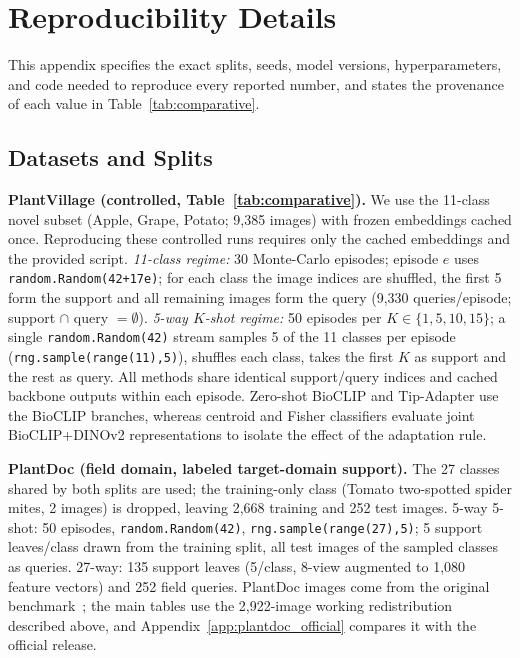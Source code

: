\appendix
\section{Reproducibility Details}
\label{app:repro}
This appendix specifies the exact splits, seeds, model versions, hyperparameters, and code needed to reproduce every reported number, and states the provenance of each value in Table~\ref{tab:comparative}.

\subsection{Datasets and Splits}
\textbf{PlantVillage (controlled, Table~\ref{tab:comparative}).} We use the 11-class novel subset (Apple, Grape, Potato; 9{,}385 images) with frozen embeddings cached once. Reproducing these controlled runs requires only the cached embeddings and the provided script. \emph{11-class regime:} 30 Monte-Carlo episodes; episode $e$ uses \texttt{random.Random(42+17e)}; for each class the image indices are shuffled, the first 5 form the support and all remaining images form the query (9{,}330 queries/episode; support $\cap$ query $=\emptyset$). \emph{5-way $K$-shot regime:} 50 episodes per $K\in\{1,5,10,15\}$; a single \texttt{random.Random(42)} stream samples 5 of the 11 classes per episode (\texttt{rng.sample(range(11),5)}), shuffles each class, takes the first $K$ as support and the rest as query. All methods share identical support/query indices and cached backbone outputs within each episode. Zero-shot BioCLIP and Tip-Adapter use the BioCLIP branches, whereas centroid and Fisher classifiers evaluate joint BioCLIP+DINOv2 representations to isolate the effect of the adaptation rule.

\textbf{PlantDoc (field domain, labeled target-domain support).} The 27 classes shared by both splits are used; the training-only class (Tomato two-spotted spider mites, 2 images) is dropped, leaving 2{,}668 training and 252 test images. 5-way 5-shot: 50 episodes, \texttt{random.Random(42)}, \texttt{rng.sample(range(27),5)}; 5 support leaves/class drawn from the training split, all test images of the sampled classes as queries. 27-way: 135 support leaves (5/class, 8-view augmented to 1{,}080 feature vectors) and 252 field queries. PlantDoc images come from the original benchmark~\cite{singh2020plantdoc}; the main tables use the 2{,}922-image working redistribution described above, and Appendix~\ref{app:plantdoc_official} compares it with the official release.

